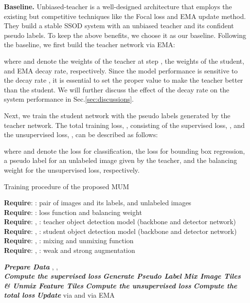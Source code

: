 \documentclass[10pt,twocolumn,letterpaper]{article}
\begin{document}
\noindent \textbf{Baseline.} Unbiased-teacher\cite{liu2021unbiased}  is a well-designed architecture that employs the existing but competitive techniques like the Focal loss and EMA update method.
They build a stable SSOD system with an unbiased teacher and its confident pseudo labels. 
To keep the above benefits, we choose it as our baseline.
Following the baseline, we first build the teacher network via EMA:

where  and  denote the weights of the teacher at step , the weights of the student, and EMA decay rate, respectively. 
Since the model performance is sensitive to the decay rate , it is essential to set the proper value to make the teacher better than the student.
We will further discuss the effect of the decay rate  on the system performance in Sec.\ref{sec:discussions}.

Next, we train the student network with the pseudo labels generated by the teacher network.
The total training loss, , consisting of the supervised loss, , and the unsupervised loss, , can be described as follows:

where  and  denote the loss for classification, the loss for bounding box regression, a pseudo label for an unlabeled image given by the teacher, and the balancing weight for the unsupervised loss, respectively. 

\begin{algorithm}[t]
\caption{Training procedure of the proposed MUM }
\label{algorithm:tut}
\textbf{Require}: : pair of images and its labels, and unlabeled images
\\\textbf{Require}: : loss function and balancing weight
\\\textbf{Require}: , : teacher object detection model (backbone and detector network) 
\\\textbf{Require}: , : student object detection model (backbone and detector network)
\\\textbf{Require}: , : mixing and unmixing function
\\\textbf{Require}: , : weak and strong augmentation

\begin{algorithmic}[1]
\STATE \textit{\textbf{Prepare Data}}
\STATE \quad , 
, \ \\
\STATE \textit{\textbf{Compute the supervised loss}}
\STATE \quad 
\STATE \quad 
\STATE \textit{\textbf{Generate Pseudo Label}}
\STATE \quad 
\STATE \textit{\textbf{Mix Image Tiles \& Unmix Feature Tiles}}
\STATE \quad  
\STATE \textit{\textbf{Compute the unsupervised loss}}
\STATE \quad  
\STATE \quad  
\STATE \textit{\textbf{Compute the total loss}}
\STATE \quad 
\STATE \textit{\textbf{Update }} via  and \textbf{} via EMA
\ENDFOR
\end{algorithmic}
\end{algorithm}
\end{document}
